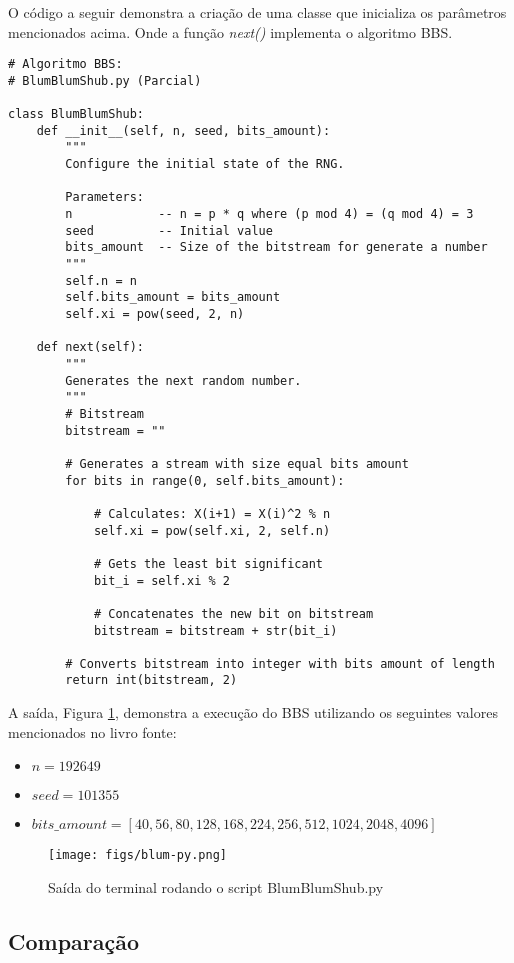 \documentclass{article}
\begin{document}
O código a seguir demonstra a criação de uma classe que inicializa os parâmetros mencionados acima. Onde a função \textit{next()} implementa o algoritmo BBS.

\pagebreak
\begin{lstlisting}
# Algoritmo BBS:
# BlumBlumShub.py (Parcial)

class BlumBlumShub:
	def __init__(self, n, seed, bits_amount):
		"""
		Configure the initial state of the RNG.

		Parameters:
		n            -- n = p * q where (p mod 4) = (q mod 4) = 3
		seed         -- Initial value
		bits_amount  -- Size of the bitstream for generate a number
		"""
		self.n = n
		self.bits_amount = bits_amount
		self.xi = pow(seed, 2, n)

	def next(self):
		"""
		Generates the next random number.
		"""
		# Bitstream
		bitstream = ""

		# Generates a stream with size equal bits amount
		for bits in range(0, self.bits_amount):

			# Calculates: X(i+1) = X(i)^2 % n
			self.xi = pow(self.xi, 2, self.n)

			# Gets the least bit significant
			bit_i = self.xi % 2

			# Concatenates the new bit on bitstream
			bitstream = bitstream + str(bit_i)
		
		# Converts bitstream into integer with bits amount of length
		return int(bitstream, 2)
\end{lstlisting}

A saída, Figura \ref{fig:blum-partial}, demonstra a execução do BBS utilizando os seguintes valores mencionados no livro fonte\cite{bib:bbs1}:
\begin{itemize}
	    \item $n = 192649$
	    \item $seed = 101355$
	    \item $bits\_amount = [40, 56, 80, 128, 168, 224, 256, 512, 1024, 2048, 4096]$
\end{itemize}

\pagebreak

\begin{figure}[h!]
	\centering
	\texttt{[image: figs/blum-py.png]}
	\caption{Saída do terminal rodando o script BlumBlumShub.py}
	\label{fig:blum-partial}
\end{figure}

\subsection{Comparação}
\end{document}
